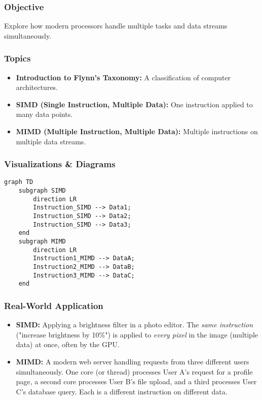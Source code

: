 \subsubsection{Objective}
Explore how modern processors handle multiple tasks and data streams simultaneously.

\subsubsection{Topics}
\begin{itemize}
    \item \textbf{Introduction to Flynn's Taxonomy:} A classification of computer architectures.
    \item \textbf{SIMD (Single Instruction, Multiple Data):} One instruction applied to many data points.
    \item \textbf{MIMD (Multiple Instruction, Multiple Data):} Multiple instructions on multiple data streams.
\end{itemize}

\subsubsection{Visualizations \& Diagrams}
\begin{verbatim}
graph TD
    subgraph SIMD
        direction LR
        Instruction_SIMD --> Data1;
        Instruction_SIMD --> Data2;
        Instruction_SIMD --> Data3;
    end
    subgraph MIMD
        direction LR
        Instruction1_MIMD --> DataA;
        Instruction2_MIMD --> DataB;
        Instruction3_MIMD --> DataC;
    end
\end{verbatim}

\subsubsection{Real-World Application}
\begin{itemize}
    \item \textbf{SIMD:} Applying a brightness filter in a photo editor. The \textit{same instruction} ("increase brightness by 10\%") is applied to \textit{every pixel} in the image (multiple data) at once, often by the GPU.
    \item \textbf{MIMD:} A modern web server handling requests from three different users simultaneously. One core (or thread) processes User A's request for a profile page, a second core processes User B's file upload, and a third processes User C's database query. Each is a different instruction on different data.
\end{itemize}

